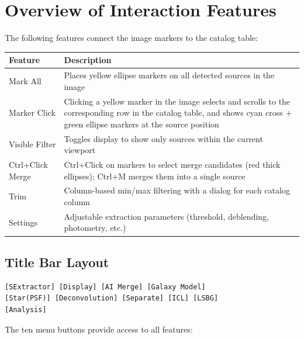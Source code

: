 \documentclass[11pt,fleqn]{book}
\begin{document}
\section{Overview of Interaction Features}

The following features connect the image markers to the catalog table:

\begin{center}
\begin{longtable}{L{3.5cm} L{9.5cm}}
\toprule
\textbf{Feature} & \textbf{Description} \\
\midrule
\endhead
Mark All & Places yellow ellipse markers on all detected sources in the image \\
\midrule
Marker Click & Clicking a yellow marker in the image selects and scrolls to the corresponding row in the catalog table, and shows cyan cross + green ellipse markers at the source position \\
\midrule
Visible Filter & Toggles display to show only sources within the current viewport \\
\midrule
Ctrl+Click Merge & Ctrl+Click on markers to select merge candidates (red thick ellipses); Ctrl+M merges them into a single source \\
\midrule
Trim & Column-based min/max filtering with a dialog for each catalog column \\
\midrule
Settings & Adjustable extraction parameters (threshold, deblending, photometry, etc.) \\
\bottomrule
\end{longtable}
\end{center}

\subsection{Title Bar Layout}

\begin{codebox}
\begin{lstlisting}[numbers=none]
[SExtractor] [Display] [AI Merge] [Galaxy Model]
[Star(PSF)] [Deconvolution] [Separate] [ICL] [LSBG]
[Analysis]
\end{lstlisting}
\end{codebox}

The ten menu buttons provide access to all features:
\end{document}
